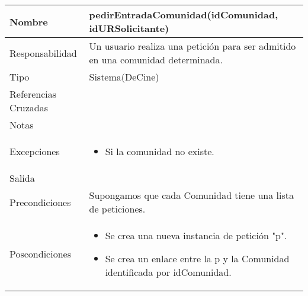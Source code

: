 \documentclass{article}
\begin{document}
\begin{table}[h]
\begin{tabular}{|l|l|l|l|l|l|}
\hline
\multicolumn{2}{|p{3cm}|}{Nombre} & \multicolumn{4}{p{10cm}|}{\textbf{pedirEntradaComunidad(idComunidad, idURSolicitante)}}\\
\hline
\multicolumn{2}{|p{3cm}|}{Responsabilidad} & \multicolumn{4}{p{10cm}|}{Un usuario realiza una petición para ser admitido en una comunidad determinada.} \\
\hline
\multicolumn{2}{|p{3cm}|}{Tipo} & \multicolumn{4}{p{10cm}|}{Sistema(DeCine)} \\
\hline
\multicolumn{2}{|p{3cm}|}{Referencias Cruzadas} & \multicolumn{4}{p{10cm}|}{} \\
\hline
\multicolumn{2}{|p{3cm}|}{Notas} & \multicolumn{4}{p{10cm}|}{} \\
\hline
\multicolumn{2}{|p{3cm}|}{Excepciones} & \multicolumn{4}{p{10cm}|}{\begin{itemize}
\item Si la comunidad no existe.
\end{itemize}} \\
\hline
\multicolumn{2}{|p{3cm}|}{Salida} & \multicolumn{4}{p{10cm}|}{} \\
\hline
\multicolumn{2}{|p{3cm}|}{Precondiciones} & \multicolumn{4}{p{10cm}|}{Supongamos que cada Comunidad tiene una lista de peticiones.} \\
\hline
\multicolumn{2}{|p{3cm}|}{Poscondiciones} & \multicolumn{4}{p{10cm}|}{\begin{itemize}
\item Se crea una nueva instancia de petición "p".
\item Se crea un enlace entre la p y la Comunidad identificada por idComunidad.
\end{itemize}} \\
\hline
\end{tabular}
\end{table}
\end{document}
